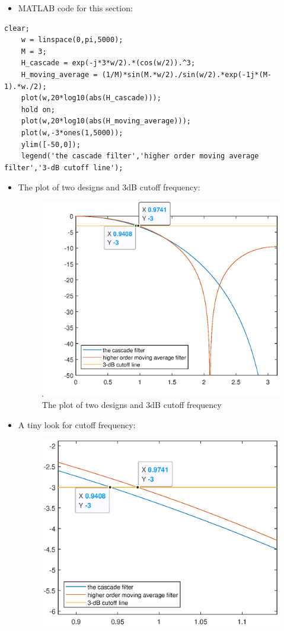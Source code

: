 \documentclass[onecolumn,oneside]{SUSTechHomework}
\begin{document}
\begin{itemize}
    \item MATLAB code for this section:
\end{itemize}
\begin{lstlisting}[title=\textbf{q6\_3\_2.m}]
    clear;
    w = linspace(0,pi,5000);
    M = 3;
    H_cascade = exp(-j*3*w/2).*(cos(w/2)).^3;
    H_moving_average = (1/M)*sin(M.*w/2)./sin(w/2).*exp(-1j*(M-1).*w./2);
    plot(w,20*log10(abs(H_cascade)));
    hold on;
    plot(w,20*log10(abs(H_moving_average)));
    plot(w,-3*ones(1,5000));
    ylim([-50,0]);
    legend('the cascade filter','higher order moving average filter','3-dB cutoff line');
\end{lstlisting}
\begin{itemize}
    \item The plot of two designs and 3dB cutoff frequency:
    \begin{figure}[H]
    \centering
    \includegraphics[width=140mm]{pictures/twodesigns1.eps}
    \caption{The plot of two designs and 3dB cutoff frequency}
    \end{figure}
    \item A tiny look for cutoff frequency:
    \begin{figure}[H]
    \centering
    \includegraphics[width=140mm]{pictures/twodesigns2.eps}

\end{figure}
\end{itemize}
\end{document}
